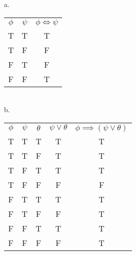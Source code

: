 \documentclass{article}
\begin{document}
\section{}
a.\\
\begin{tabular}{ c c c }
  $\phi$ & $\psi$ & $\phi \Leftrightarrow \psi$  \\
  T & T & T \\
  T & F & F \\
  F & T & F \\
  F & F & T \\
\end{tabular} \\
b.\\
\begin{tabular}{ c c c c c }
  $\phi$ & $\psi$ & $\theta$ & $\psi \vee \theta$ & $\phi \implies (\psi \vee \theta)$ \\
  T      & T      & T          & T          & T  \\
  T      & T      & F          & T          & T  \\
  T      & F      & T          & T          & T  \\
  T      & F      & F          & F          & F  \\
  F      & T      & T          & T          & T  \\
  F      & T      & F          & F          & T  \\
  F      & F      & T          & T          & T  \\
  F      & F      & F          & F          & T  \\
\end{tabular} \\

\section{}
\end{document}
